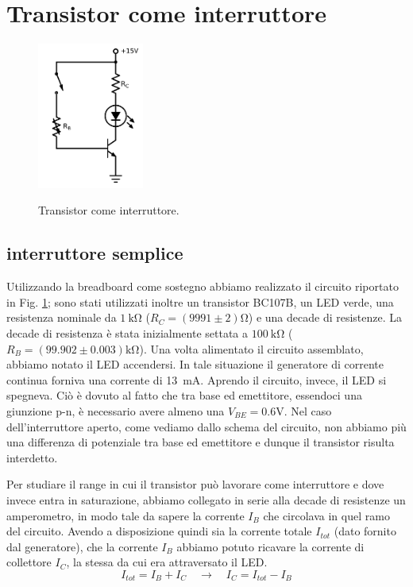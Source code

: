 \section{Transistor come interruttore}

\begin{figure}
	\caption{Transistor come interruttore.}
	\includegraphics[width=35mm]{cc1.pdf}
	\label{fig:cc1}
\end{figure}

\subsection{interruttore semplice}
Utilizzando la breadboard come sostegno abbiamo realizzato il circuito riportato in Fig. \ref{fig:cc1}; sono stati utilizzati inoltre un transistor BC107B, un LED verde, una resistenza nominale da $\SI{1}{\kilo\ohm}$ ($R_C =(9991 \pm 2) \si{\ohm}$) e una decade di resistenze. La decade di resistenza è stata inizialmente settata a $\SI{100}{\kilo\ohm}$ ($R_B = (99.902 \pm 0.003)\si{\kilo\ohm}$).
Una volta alimentato il circuito assemblato, abbiamo notato il LED accendersi. In tale situazione il generatore di corrente continua forniva una corrente di \SI{13}{\milli\ampere}. Aprendo il circuito, invece, il LED si spegneva. Ciò è dovuto al fatto che tra base ed emettitore, essendoci una giunzione p-n, è necessario avere almeno una $V_{BE}=0.6 \si{\volt}$. Nel caso dell'interruttore aperto, come vediamo dallo schema del circuito, non abbiamo più una differenza di potenziale tra base ed emettitore e dunque il transistor risulta interdetto. 

Per studiare il range in cui il transistor può lavorare come interruttore e dove invece entra in saturazione, abbiamo collegato in serie alla decade di resistenze un amperometro, in modo tale da sapere la corrente $I_B$ che circolava in quel ramo del circuito. Avendo a disposizione quindi sia la corrente totale $I_{tot}$ (dato fornito dal generatore), che la corrente $I_B$ abbiamo potuto ricavare la corrente di collettore $I_C$, la stessa da cui era attraversato il LED.
\begin{equation*}
	I_{tot} = I_B + I_C \quad \rightarrow \quad I_C = I_{tot} - I_B
\end{equation*}

